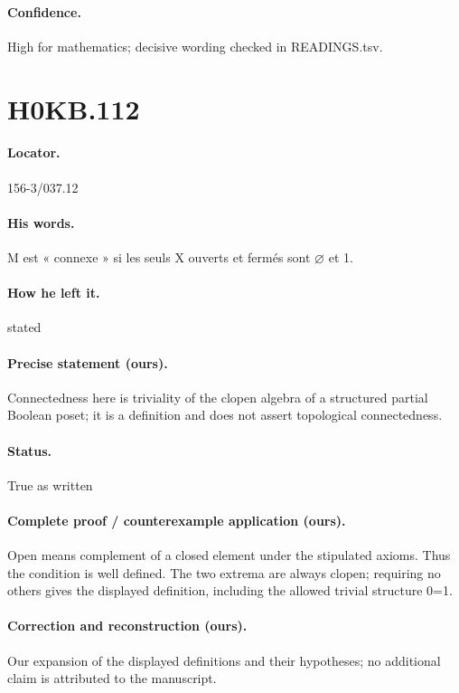 \paragraph{Confidence.} High for mathematics; decisive wording checked in READINGS.tsv.

\section*{H0KB.112}\label{statement:H0KB.112}
\paragraph{Locator.} 156-3/037.12

\paragraph{His words.} M est « connexe » si les seuls X ouverts et fermés sont \ensuremath{\varnothing} et 1.

\paragraph{How he left it.} stated

\paragraph{Precise statement (ours).} Connectedness here is triviality of the clopen algebra of a structured partial Boolean poset; it is a definition and does not assert topological connectedness.

\paragraph{Status.} True as written

\paragraph{Complete proof / counterexample application (ours).} Open means complement of a closed element under the stipulated axioms. Thus the condition is well defined. The two extrema are always clopen; requiring no others gives the displayed definition, including the allowed trivial structure 0=1.

\paragraph{Correction and reconstruction (ours).} Our expansion of the displayed definitions and their hypotheses; no additional claim is attributed to the manuscript.

